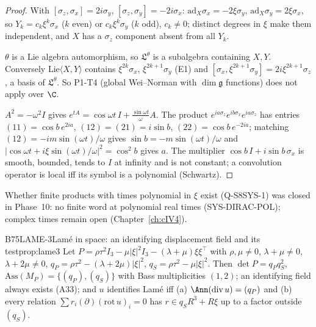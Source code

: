 \begin{proof}
With $[\sigma_z,\sigma_x]=2i\sigma_y$, $[\sigma_z,\sigma_y]=-2i\sigma_x$: $\mathrm{ad}_X\sigma_x=-2\xi\sigma_y$, $\mathrm{ad}_X\sigma_y=2\xi\sigma_x$, so $Y_k=c_k\xi^k\sigma_x$ ($k$ even) or $c_k\xi^k\sigma_y$ ($k$ odd), $c_k\ne0$; distinct degrees in $\xi$ make them independent, and $X$ has a $\sigma_z$ component absent from all $Y_k$.

$\theta$ is a Lie algebra automorphism, so $\mathfrak L^\theta$ is a subalgebra containing $X,Y$. Conversely $\mathrm{Lie}\langle X,Y\rangle$ contains $\xi^{2k}\sigma_x$, $\xi^{2k+1}\sigma_y$ (E1) and $[\sigma_x,\xi^{2k+1}\sigma_y]=2i\xi^{2k+1}\sigma_z$, a basis of $\mathfrak L^\theta$. So P1-T4 (global Wei--Norman with $\dim\mathfrak g$ functions) does not apply over $\C$.

$A^2=-\omega^2I$ gives $e^{tA}=\cos\omega t\,I+\frac{\sin\omega t}\omega A$. The product $e^{ia\sigma_z}e^{ib\sigma_x}e^{ia\sigma_z}$ has entries $(11)=\cos b\,e^{2ia}$, $(12)=(21)=i\sin b$, $(22)=\cos b\,e^{-2ia}$; matching $(12)=-im\sin(\omega t)/\omega$ gives $\sin b=-m\sin(\omega t)/\omega$ and $|\cos\omega t+i\xi\sin(\omega t)/\omega|^2=\cos^2b$ gives $a$. The multiplier $\cos b\,I+i\sin b\,\sigma_x$ is smooth, bounded, tends to $I$ at infinity and is not constant; a convolution operator is local iff its symbol is a polynomial (Schwartz).

\end{proof}

\begin{caution}[title=Open (resolved in Phase 10 for real times)]
Whether finite products with times polynomial in $\xi$ exist (Q-S8SYS-1) was closed in Phase~10: no finite word at polynomial real times (SYS-DIRAC-POL); complex times remain open (Chapter~\ref{ch:cIV4}).
\end{caution}

\begin{dimcard}{B75}{LAME-3}{Lam\'e in space: an identifying displacement field and its test}{\proved}{prop:lame3}
Let $P=\rho\tau^2I_3-\mu|\xi|^2I_3-(\lambda+\mu)\xi\xi^{\top}$ with $\rho,\mu\ne0$, $\lambda+\mu\ne0$, $\lambda+2\mu\ne0$, $q_P=\rho\tau^2-(\lambda+2\mu)|\xi|^2$, $q_S=\rho\tau^2-\mu|\xi|^2$. Then $\det P=q_Pq_S^2$, $\mathrm{Ass}(M_P)=\{(q_P),(q_S)\}$ with Bass multiplicities $(1,2)$; an identifying field always exists (A33); and $u$ identifies Lam\'e iff (a) $\Ann(\mathrm{div}\,u)=(q_P)$ and (b) every relation $\sum r_i(\partial)(\mathrm{rot}\,u)_i=0$ has $r\in q_SR^3+R\xi$ up to a factor outside $(q_S)$.
\end{dimcard}

